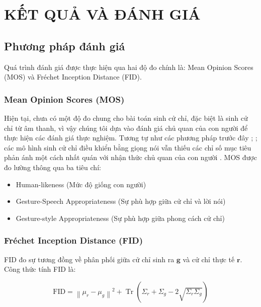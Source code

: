 
\chapter{KẾT QUẢ VÀ ĐÁNH GIÁ}
\label{chap:evalution}

\section{Phương pháp đánh giá}

Quá trình đánh giá được thực hiện qua hai độ đo chính là: Mean Opinion Scores (MOS) và Fréchet Inception Distance (FID).

\subsection{Mean Opinion Scores (MOS)}

Hiện tại, chưa có một độ đo chung cho bài toán sinh cử chỉ, đặc biệt là sinh cử chỉ từ âm thanh, vì vậy chúng tôi dựa vào đánh giá chủ quan của con người để thực hiện các đánh giá thực nghiệm. 
Tương tự như các phương pháp trước đây \cite{yoon2022genea}; \cite{kucherenko2021large}; các mô hình sinh cử chỉ điều khiển bằng giọng nói vẫn thiếu các chỉ số mục tiêu phản ánh một cách nhất quán với nhận thức chủ quan của con người  \cite{alexanderson2022listen}.
MOS được đo lường thông qua ba tiêu chí:

\begin{itemize}
	\item Human-likeness (Mức độ giống con người)
	\item Gesture-Speech Appropriateness (Sự phù hợp giữa cử chỉ và lời nói)
	\item Gesture-style Appropriateness (Sự phù hợp giữa phong cách cử chỉ)
\end{itemize}


\subsection{Fréchet Inception Distance (FID)}
FID đo sự tương đồng về phân phối giữa cử chỉ sinh ra $\mathbf{g}$ và cử chỉ thực tế $\mathbf{r}$. Công thức tính FID là:

\begin{equation}
	\text{FID} = \left\| \mu_r - \mu_g \right\|^2 + \operatorname{Tr}\left( \Sigma_r + \Sigma_g - 2 \sqrt{\Sigma_r \Sigma_g} \right)
\end{equation}


